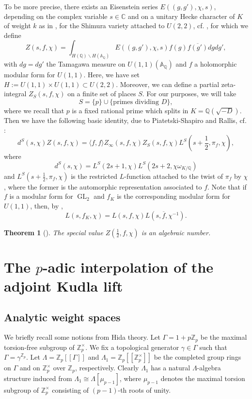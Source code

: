 \documentclass[12pt,a4paper,reqno]{amsart}
\theoremstyle{definition}
\numberwithin{definition}{subsection}
\theoremstyle{definition}
\numberwithin{Definition}{subsection}
\theoremstyle{remark}
\theoremstyle{remark}
\numberwithin{Remark}{subsection}
\theoremstyle{remark}
\theoremstyle{plain}
\newtheorem{Theorem}{Theorem}
\numberwithin{Theorem}{subsection}
\theoremstyle{plain}
\theoremstyle{plain}
\theoremstyle{plain}
\theoremstyle{plain}
\theoremstyle{plain}
\theoremstyle{plain}
\theoremstyle{plain}
\newcommand*{\Z}{\mathbb{Z}}
\newcommand*{\Q}{\mathbb{Q}}
\newcommand*{\Cc}{\mathbb{C}}
\newcommand*{\A}{\mathbb{A}}
\DeclareMathOperator{\GL}{GL}
\begin{document}
To be more precise, there exists an Eisenstein series $E((g,g'),\chi,s)$, depending on the complex variable $s\in \Cc$ and on a unitary Hecke character of $K$ of weight $k$ as in \cite[p. 26]{iudica}, for the Shimura variety attached to $U(2,2)$, cf. \cite[p. 231]{harris}, for which we define
\[
Z(s,f,\chi)=\int_{H(\Q)\backslash H(\A_\Q)}E((g,g'),\chi,s)f(g)\overline{f(g')}dgdg',
\]
with $dg=dg'$ the Tamagawa measure on $U(1,1)(\A_\Q)$ and $f$ a holomorphic modular form for $U(1,1)$. Here, we have set $H:=U(1,1)\times U(1,1)\subset U(2,2)$. Moreover, we can define a partial zeta-integral $Z_S(s,f,\chi)$ on a finite set of places $S$. For our purposes, we will take 
\[
S=\{p\}\cup\{\text{primes dividing } D\},
\]
where we recall that $p$ is a fixed rational prime which splits in $K=\Q(\sqrt{-D})$.
Then we have the following basic identity, due to Piatetski-Shapiro and Rallis, cf. \cite[p. 82]{eischen}:
\begin{equation}
\label{BI}
d^S(s,\chi)Z(s,f,\chi)=\langle f,f\rangle Z_\infty(s,f,\chi) Z_S(s,f,\chi)L^S(s+\frac{1}{2},\pi_f,\chi),
\end{equation}
where 
\[
d^S(s,\chi)=L^S(2s+1,\chi)L^S(2s+2,\chi\omega_{K/\Q})
\]
and $L^S(s+\frac{1}{2},\pi_f,\chi)$ is the restricted $L$-function attached to the twist of $\pi_f$ by $\chi$, where the former is the automorphic representation associated to $f$. Note that if $f$ is a modular form for $\GL_2$ and $f_K$ is the corresponding modular form for $U(1,1)$, then, by \cite[p. 242, 245]{harris}, 
\[
L(s,f_K,\chi)=L(s,f,\chi)L(s,\overline{f},\chi^{-1}).
\]
\begin{Theorem}[]
The special value $Z(\frac{1}{2},f,\chi)$ is an algebraic number.
\end{Theorem}
\section{The $p$-adic interpolation of the adjoint Kudla lift}
\subsection{Analytic weight spaces}
We briefly recall some notions from Hida theory.
Let $\Gamma=1+p\Z_p$ be the maximal torsion-free subgroup of $\Z_p^\times$. We fix a topological generator $\gamma\in \Gamma$ such that $\Gamma=\gamma^{\Z_p}$. Let $\Lambda=\Z_p[[\Gamma]]$ and $\Lambda_1=\Z_p[[\Z_p^\times]]$ be the completed group rings on $\Gamma$ and on $\Z_p^\times$ over $\Z_p$, respectively. Clearly $\Lambda_1$ has a natural $\Lambda$-algebra structure induced from $\Lambda_1\cong \Lambda[\mu_{p-1}]$, where $\mu_{p-1}$ denotes the maximal torsion subgroup of $\Z_p^\times$ consisting of $(p-1)$-th roots of unity.
\end{document}
